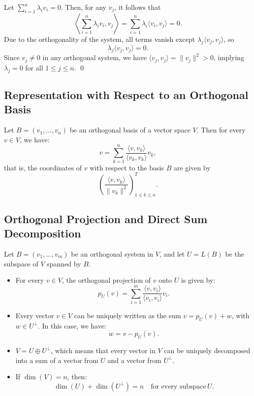 Let \( \sum_{i=1}^n \lambda_i v_i = 0 \). Then, for any \( v_j \), it follows that
\[
\left\langle \sum_{i=1}^n \lambda_i v_i, v_j \right\rangle = \sum_{i=1}^n \lambda_i \langle v_i, v_j \rangle = 0.
\]
Due to the orthogonality of the system, all terms vanish except \( \lambda_j \langle v_j, v_j \rangle \), so
\[
\lambda_j \langle v_j, v_j \rangle = 0.
\]
Since \( v_j \neq 0 \) in any orthogonal system, we have \( \langle v_j, v_j \rangle = \|v_j\|^2 > 0 \), implying \( \lambda_j = 0 \) for all \( 1 \leq j \leq n \). \qed

\subsection{Representation with Respect to an Orthogonal Basis}

Let \( B = (v_1, \ldots, v_n) \) be an orthogonal basis of a vector space \( V \). Then for every \( v \in V \), we have:
\[
v = \sum_{k=1}^n \frac{\langle v, v_k \rangle}{\langle v_k, v_k \rangle} v_k,
\]
that is, the coordinates of \( v \) with respect to the basis \( B \) are given by
\[
\left( \frac{\langle v, v_k \rangle}{\|v_k\|^2} \right)_{1 \leq k \leq n}^T.
\]


\subsection{Orthogonal Projection and Direct Sum Decomposition}

Let \( B = (v_1, \ldots, v_m) \) be an orthogonal system in \( V \), and let \( U = L(B) \) be the subspace of \( V \) spanned by \( B \).

\begin{itemize}[label=\(-\)]
    \item For every \( v \in V \), the orthogonal projection of \( v \) onto \( U \) is given by:
    \[
    p_U(v) = \sum_{i=1}^{m} \frac{\langle v, v_i \rangle}{\langle v_i, v_i \rangle} v_i.
    \]

    \item Every vector \( v \in V \) can be uniquely written as the sum \( v = p_U(v) + w \), with \( w \in U^\perp \). In this case, we have:
    \[
    w = v - p_U(v).
    \]

    \item \( V = U \oplus U^\perp \), which means that every vector in \( V \) can be uniquely decomposed into a sum of a vector from \( U \) and a vector from \( U^\perp \).

    \item If \( \dim(V) = n \), then:
    \[
    \dim(U) + \dim(U^\perp) = n \quad \text{for every subspace} \, U.
    \]
\end{itemize}

